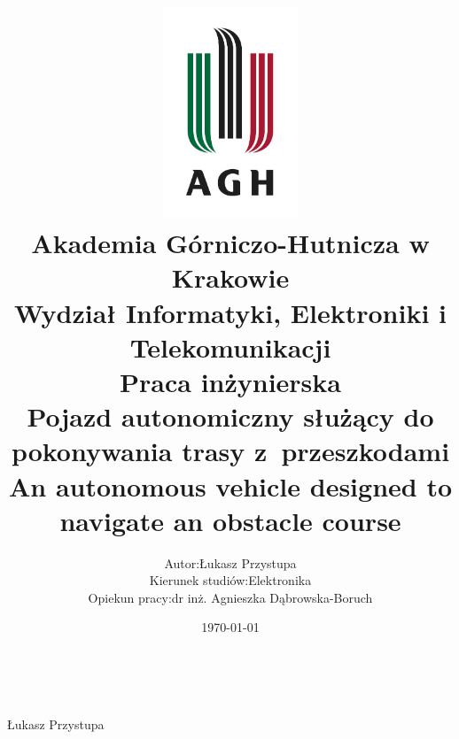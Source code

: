 \documentclass[12pt]{article}
\title{
    \includegraphics[width = 0.3\textwidth]{agh_logo.jpg}\\
    \textbf{Akademia Górniczo-Hutnicza w Krakowie}\\
    Wydział Informatyki, Elektroniki i  Telekomunikacji\\\vspace{2cm}
    \textbf{Praca inżynierska}\\
    Pojazd autonomiczny służący do pokonywania trasy z~przeszkodami\\\vspace{1cm}
    \small{An autonomous vehicle designed to navigate an obstacle course}
}
\author{
    \begin{tabularx}{\textwidth}{l l}
    Autor: &Łukasz Przystupa\\
    Kierunek studiów: & Elektronika\\
    Opiekun pracy: &dr inż. Agnieszka Dąbrowska-Boruch
    \end{tabularx}
}
\date{\vspace{2cm}\today}
\numberwithin{equation}{section}
\begin{document}
    \begin{titlepage}
        \maketitle
        \thispagestyle{empty}
        \newpage
        \
        \thispagestyle{empty}
    \end{titlepage}

        
        \tableofcontents
        \newpage
    
    
    
    
    
    
    
    

    \vfill
    \begin{flushright}
        Łukasz Przystupa
    \end{flushright}

    \newpage
    \nocite{*}
    \printbibliography
\end{document}
